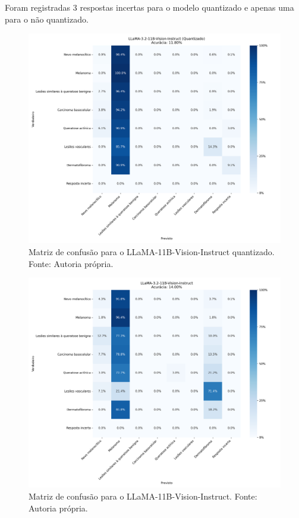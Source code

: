 Foram registradas 3 respostas incertas para o modelo quantizado e apenas uma para o não quantizado.

\begin{figure}[ht]
    \centering
    \includegraphics[width=1\columnwidth,keepaspectratio]{images/confusion_matrix_llama_3.2_11b_vision_instruct_quantized.png}
    \caption{\small Matriz de confusão para o \ac{LLaMA}-11B-Vision-Instruct quantizado. Fonte: Autoria própria.}
    \label{fig:confusion_matrix_llama_quantized}
\end{figure}

\clearpage

\begin{figure}[ht]
    \centering
    \includegraphics[width=1\columnwidth,keepaspectratio]{images/confusion_matrix_llama_3.2_11b_vision_instruct.png}
    \caption{\small Matriz de confusão para o \ac{LLaMA}-11B-Vision-Instruct. Fonte: Autoria própria.}
    \label{fig:confusion_matrix_llama}
\end{figure}

